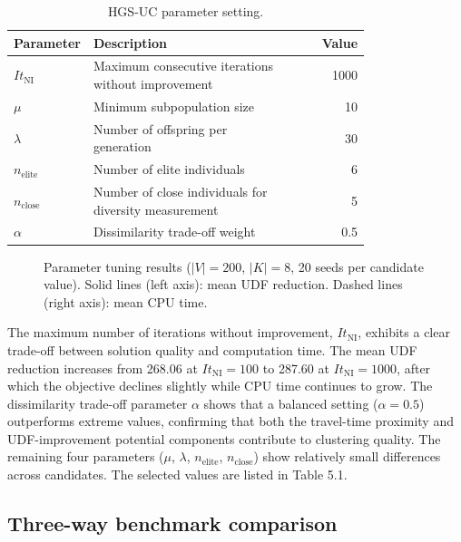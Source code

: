 \documentclass[11pt]{article}
\numberwithin{table}{section}
\numberwithin{figure}{section}
\begin{document}
\begin{table}[htbp]
\centering
\caption{HGS-UC parameter setting.}
\label{tab:hgsuc-parameters}
\begin{tabular}{p{0.22\linewidth}p{0.56\linewidth}r}
\toprule
Parameter & Description & Value \\
\midrule
$I{{t}_{\text{NI}}}$ & Maximum consecutive iterations without improvement & 1000 \\
$\mu$ & Minimum subpopulation size & 10 \\
$\lambda$ & Number of offspring per generation & 30 \\
${{n}_{\text{elite}}}$ & Number of elite individuals & 6 \\
${{n}_{\text{close}}}$ & Number of close individuals for diversity measurement & 5 \\
$\alpha$ & Dissimilarity trade-off weight & 0.5 \\
\bottomrule
\end{tabular}
\end{table}

\begin{figure}[htbp]
\centering
{}
\caption{Parameter tuning results ($\mid V\mid =200$, $\left| K \right|=8$, 20 seeds per candidate value). Solid lines (left axis): mean UDF reduction. Dashed lines (right axis): mean CPU time.}
\end{figure}

The maximum number of iterations without improvement, $I{{t}_{\text{NI}}}$, exhibits a clear trade-off between solution quality and computation time. The mean UDF reduction increases from 268.06 at $I{{t}_{\text{NI}}}=100$ to 287.60 at $I{{t}_{\text{NI}}}=1000$, after which the objective declines slightly while CPU time continues to grow. The dissimilarity trade-off parameter $\alpha $ shows that a balanced setting ($\alpha =0.5$) outperforms extreme values, confirming that both the travel-time proximity and UDF-improvement potential components contribute to clustering quality. The remaining four parameters ($\mu $, $\lambda $, ${{n}_{\text{elite}}}$, ${{n}_{\text{close}}}$) show relatively small differences across candidates. The selected values are listed in Table 5.1.

\subsection{Three-way benchmark comparison}
\end{document}
